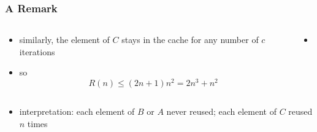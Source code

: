 \documentclass[12pt,dvipdfmx]{beamer}
\newcommand{\ao}[1]{{\color{blue}#1}}
\begin{document}
\begin{frame}
\frametitle{A Remark}
\begin{columns}
  \begin{column}{0.5\textwidth}
\begin{itemize}
\item similarly, the element of $C$ stays in the cache for any number of
  $c$ iterations
\item so
\[ R(n) \leq (2n + 1) n^2 = 2n^3 + n^2 \]
\end{itemize}
  \end{column}

  \begin{column}{0.5\textwidth}
    \begin{itemize}
    \item []
{\tiny\def\svgwidth{0.9\textwidth}}
\end{itemize}
\end{column}
\end{columns}

\begin{itemize}
\item []
\ao{interpretation:} each element of $B$ or $A$ never reused; each element of $C$
reused $n$ times
\end{itemize}
\end{frame}



\end{document}
